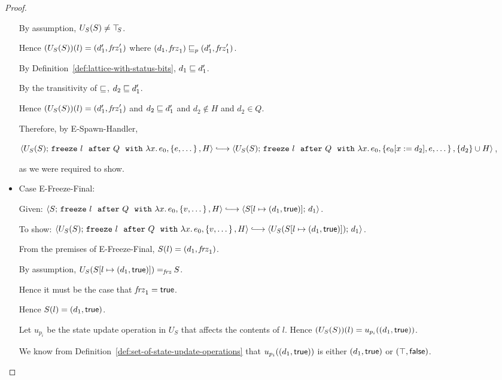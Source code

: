 \begin{proof}
\begin{itemize}
      By assumption, $U_S(S) \neq \top\hspace{-0.85mm}_{S}$.

      Hence $(U_S(S))(l) = (d'_1, \mathit{frz}'_1)$ where
      $(d_1, \mathit{frz}_1) \sqsubseteq_p (d'_1, \mathit{frz}'_1)$.

      By Definition~\ref{def:lattice-with-status-bits}, $d_1 \sqsubseteq
      d'_1$.

      By the transitivity of $\sqsubseteq$, $d_2 \sqsubseteq d'_1$.

      Hence $(U_S(S))(l) = (d'_1, \mathit{frz}'_1)$ and $d_2 \sqsubseteq
      d'_1$ and $d_2 \notin H$ and $d_2 \in Q$.

      Therefore, by {\sc E-Spawn-Handler},

      $\config{U_S(S)}{\freezeafterfull{l}{Q}{\lam{x}{e_0}}{\setof{e,
            \dots}}{H}} \parstepsto
      \config{U_S(S)}{\freezeafterfull{l}{Q}{\lam{x}{e_0}}{\setof{\subst{e_0}{x}{d_2},
            e, \dots}} {\{d_2\}\cup H}}$,

      as we were required to show.

    \item Case {\sc E-Freeze-Final}:


      Given:
      $\config{S}{\freezeafterfull{l}{Q}{\lam{x}{e_0}}{\setof{v,
            \dots}}{H}} \parstepsto
      \config{\extS{S}{l}{d_1}{\frozentrue}}{d_1}$.

      To show:
      $\config{U_S(S)}{\freezeafterfull{l}{Q}{\lam{x}{e_0}}{\setof{v,
            \dots}}{H}} \parstepsto
      \config{U_S(\extS{S}{l}{d_1}{\frozentrue})}{d_1}$.

      From the premises of {\sc E-Freeze-Final}, $S(l) =
      (d_1, \mathit{frz}_1)$.

      By assumption, $U_S(S[l \mapsto (d_1, \textsf{true})]) =_{\textit{frz}} S$.

      Hence it must be the case that $\mathit{frz}_1 = \textsf{true}$.

      Hence $S(l) = (d_1, \textsf{true})$.

      Let $u_{p_i}$ be the state update operation in $U_S$ that
      affects the contents of $l$.  Hence $(U_S(S))(l) =
      u_{p_i}((d_1, \textsf{true}))$.

      We know from Definition~\ref{def:set-of-state-update-operations}
      that $u_{p_i}((d_1, \textsf{true}))$ is either
      $(d_1, \textsf{true})$ or $(\top, \textsf{false})$.


\end{itemize}
\end{proof}
